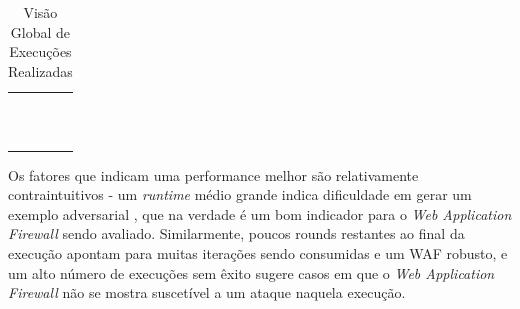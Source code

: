 \begin{table}[H]
\centering
\caption{Visão Global de Execuções Realizadas}
\begin{supertabular}{m{4.0cm}m{3.7cm}m{3.6cm}m{3.0cm}}
\hline
{} &
 &
 &
\centering{}\\\hline
{} &
 &
 &
\centering{}\\
 &
 &
 &
\centering{}\\
 &
 &
 &
\centering{}\\
 &
 &
 &
\centering{}\\
 &
 &
 &
\centering{}\\
 &
 &
 &
\centering{}\\
 &
 &
 &
\centering{}\\
 &
 &
 &
\centering{}\\
 &
 &
 &
\centering{}\\
 &
 &
 &
\centering{}\\
 &
 &
 &
\centering{}\\
\hline
\end{supertabular}
    \label{tab:tests}
\end{table}
\bigskip

Os fatores que indicam uma performance melhor são relativamente contraintuitivos - um \textit{runtime} médio grande indica dificuldade em gerar um exemplo adversarial \cite{adversarial_example}, que na verdade é um bom indicador para o \textit{Web Application Firewall} sendo avaliado. Similarmente, poucos rounds restantes ao final da execução apontam para muitas iterações sendo consumidas e um WAF robusto, e um alto número de execuções sem êxito sugere casos em que o \textit{Web Application Firewall} não se mostra suscetível a um ataque naquela execução. 

